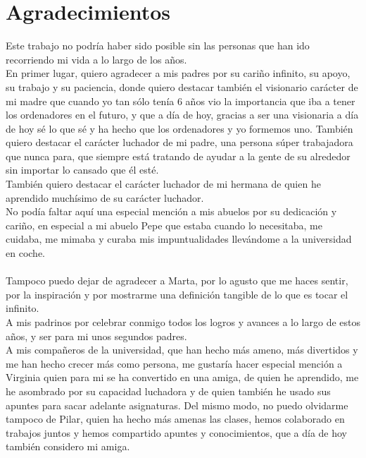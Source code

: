 \section*{Agradecimientos}
\begin{dedicatoria}
	Este trabajo no podría haber sido posible sin las personas que han ido recorriendo mi vida a lo largo de los años. \\
	
	En primer lugar, quiero agradecer a mis padres por su cariño infinito, su apoyo, su trabajo y su paciencia, donde quiero destacar también el visionario carácter de mi madre que cuando yo tan sólo tenía 6 años vio la importancia que iba a tener los ordenadores en el futuro, y que a día de hoy, gracias a ser una visionaria a día de hoy sé lo que sé y ha hecho que los ordenadores y yo formemos uno. También quiero destacar el carácter luchador de mi padre, una persona súper trabajadora que nunca para, que siempre está tratando de ayudar a la gente de su alrededor sin importar lo cansado que él esté. \\
	
	También quiero destacar el carácter luchador de mi hermana de quien he aprendido muchísimo de su carácter luchador. \\
	
	No podía faltar aquí una especial mención a mis abuelos por su dedicación y cariño, en especial a mi abuelo Pepe que estaba cuando lo necesitaba, me cuidaba, me mimaba y curaba mis impuntualidades llevándome a la universidad en coche. \\ \\
	Tampoco puedo dejar de agradecer a Marta, por lo agusto que me haces sentir, por la inspiración y por mostrarme una definición tangible de lo que es tocar el infinito. \\
	
	A mis padrinos por celebrar conmigo todos los logros y avances a lo largo de estos años, y ser para mi unos segundos padres. \\
	
	A mis compañeros de la universidad, que han hecho más ameno, más divertidos y me han hecho crecer más como persona, me gustaría hacer especial mención a Virginia quien para mi se ha convertido en una amiga, de quien he aprendido, me he asombrado por su capacidad luchadora y de quien también he usado sus apuntes para sacar adelante asignaturas. Del mismo modo, no puedo olvidarme tampoco de Pilar, quien ha hecho más amenas las clases, hemos colaborado en trabajos juntos y hemos compartido apuntes y conocimientos, que a día de hoy también considero mi amiga. \\
	

\end{dedicatoria}
